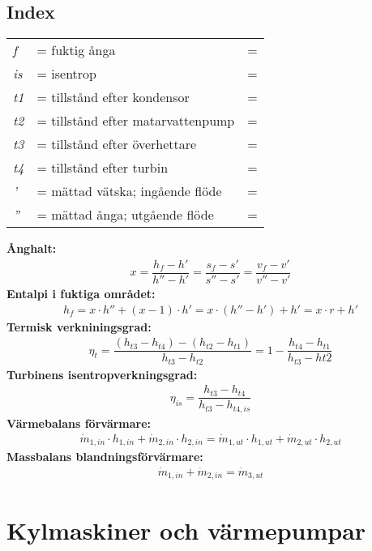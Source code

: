 \subsection*{Index}
	\begin{tabularx}{\linewidth} { l
	>{\raggedright\arraybackslash\hsize=1.5\hsize\linewidth=\hsize}X
	>{\raggedright\arraybackslash\hsize=0.5\hsize\linewidth=\hsize}X}
	\textit{f} & fuktig ånga\\ 
	\textit{is} & isentrop\\ 
	\textit{t1} & tillstånd efter kondensor\\ 
	\textit{t2} & tillstånd efter matarvattenpump\\ 
	\textit{t3} & tillstånd efter överhettare\\ 
	\textit{t4} & tillstånd efter turbin\\ 
	\textit{'} & mättad vätska; ingående flöde\\ 
	\textit{''} & mättad ånga; utgående flöde\\ 
	\end{tabularx}
	\textbf{Ånghalt:}
	\begin{align*}
		x = \dfrac{h_f-h'}{h''-h'} = \dfrac{s_f-s'}{s''-s'} = \dfrac{v_f-v'}{v''-v'}
	\end{align*}
	\textbf{Entalpi i fuktiga området:}
	\begin{align*}
		h_f = x \cdot h'' + (x  - 1)  \cdot h' = x \cdot (h'' - h') + h' = x \cdot r + h' 
	\end{align*}
	\textbf{Termisk verkniningsgrad:}
	\begin{align*}
		\eta_t=\dfrac{(h_{t3}-h_{t4})-(h_{t2}-h_{t1})}{h_{t3}-h_{t2}}=1-\dfrac{h_{t4}-h_{t1}}{h_{t3}-h{t2}}
	\end{align*}
	\textbf{Turbinens isentropverkningsgrad:}
	\begin{align*}
		\eta_{is}=\dfrac{h_{t3}-h_{t4}}{h_{t3}-h_{t4,is}}
	\end{align*}
	\textbf{Värmebalans förvärmare:}
	\begin{align*}
		\dot{m}_{1,in}\cdot h_{1,in}+\dot{m}_{2,in}\cdot h_{2,in} = \dot{m}_{1,ut}\cdot h_{1,ut}+\dot{m}_{2,ut}\cdot h_{2,ut}
	\end{align*}
	\textbf{Massbalans blandningsförvärmare:}
	\begin{align*}
		\dot{m}_{1,in}+\dot{m}_{2,in} = \dot{m}_{3,ut}
	\end{align*}
\section*{Kylmaskiner och värmepumpar}
